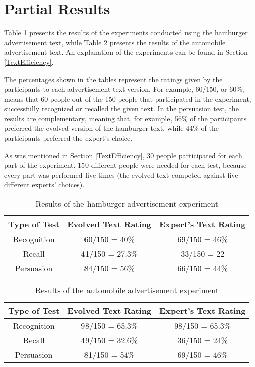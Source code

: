 \documentclass{acm_proc_article-sp}
\begin{document}
\section{Partial Results}
\label{Results}

Table \ref{Hamburger} presents the results of the experiments conducted
using the hamburger advertisement text, while Table \ref{Automobile}
presents the results of the automobile advertisement text. An
explanation of the experiments can be found in Section
\ref{TextEfficiency}.

The percentages shown in the tables represent the ratings given by the
participants to each advertisement text version. For example, 60/150,
or 60\%, means that 60 people out of the 150 people that participated
in the experiment, successfully recognized or recalled the given
text. In the persuasion test, the results are complementary, meaning
that, for example, 56\% of the participants preferred the evolved
version of the hamburger text, while 44\% of the participants preferred
the expert's choice.

As was mentioned in Section \ref{TextEfficiency}, 30 people
participated for each part of the experiment. 150 different people were needed
for each test, because every part was performed five times (the
evolved text competed against five different experts' choices).

\begin{table}
  \begin{tabular}{| c || c | c |}
    \hline
    Type of Test & Evolved Text Rating & Expert's Text Rating \\ \hline
    Recognition & 60/150 = 40\% & 69/150 = 46\% \\ \hline
    Recall & 41/150 = 27.3\% & 33/150 = 22 \\ \hline
    Persuasion & 84/150 = 56\% & 66/150 = 44\% \\
    \hline
  \end{tabular}
  \caption{Results of the hamburger advertisement experiment}
  \label{Hamburger}
\end{table}

\begin{table}
  \begin{tabular}{| c || c | c |}
    \hline
    Type of Test & Evolved Text Rating & Expert's Text Rating \\ \hline
    Recognition & 98/150 = 65.3\% & 98/150 = 65.3\% \\ \hline
    Recall & 49/150 = 32.6\% & 36/150 = 24\% \\ \hline
    Persuasion & 81/150 = 54\% & 69/150 = 46\% \\
    \hline
  \end{tabular}
  \caption{Results of the automobile advertisement experiment}
  \label{Automobile}
\end{table}
\end{document}

